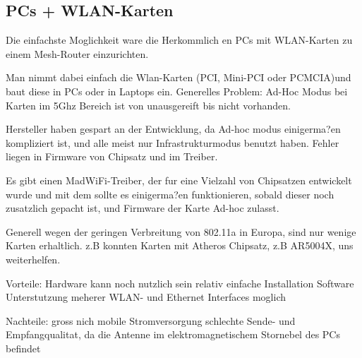 \subsection{PCs + WLAN-Karten}

Die einfachste Moglichkeit ware die Herkommlich en PCs mit WLAN-Karten zu einem Mesh-Router einzurichten. 

Man nimmt dabei einfach die Wlan-Karten (PCI, Mini-PCI oder PCMCIA)und baut diese in PCs oder in Laptops ein. 
Generelles Problem: 
 Ad-Hoc Modus bei Karten im 5Ghz Bereich ist von unausgereift bis nicht vorhanden. 

Hersteller haben gespart an der Entwicklung, da Ad-hoc modus einigerma?en kompliziert ist, und alle meist nur Infrastrukturmodus benutzt haben. Fehler liegen in Firmware von Chipsatz und im Treiber. 

Es gibt einen MadWiFi-Treiber, der fur eine Vielzahl von Chipsatzen entwickelt wurde und mit dem sollte es einigerma?en funktionieren, sobald dieser noch zusatzlich gepacht ist, und Firmware der Karte Ad-hoc zulasst. 

Generell wegen der geringen Verbreitung von 802.11a in Europa, sind nur wenige Karten erhaltlich. z.B konnten Karten mit Atheros Chipsatz, z.B AR5004X, uns weiterhelfen. 

Vorteile: 
Hardware kann noch nutzlich sein 
relativ einfache Installation 
Software Unterstutzung 
meherer WLAN- und Ethernet Interfaces moglich 

Nachteile: 
gross 
nich mobile 
Stromversorgung 
schlechte Sende- und Empfangqualitat, da die Antenne im elektromagnetischem Stornebel des PCs befindet 




